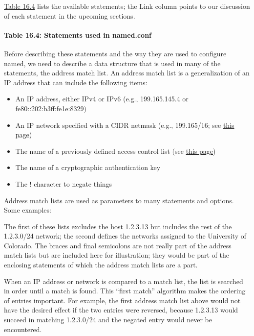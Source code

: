 \protect\hyperlink{part0024_split_035.htmlux5cux23_idTextAnchor896}{Table
16.4} lists the available statements; the Link column points to our
discussion of each statement in the upcoming sections.

\paragraph[{Table 16.4: }Statements used in
{named.conf}]{\texorpdfstring{{Table 16.4:
}\protect\hypertarget{part0024_split_035.htmlux5cux23_idTextAnchor896}{}{}Statements
used in {named.conf}}{Table 16.4: Statements used in named.conf}}


Before describing these statements and the way they are used to
configure {named}, we need to describe a data structure that is used in
many of the statements, the address match list. An address match list is
a generalization of an IP address that can include the following items:

\begin{itemize}
\item
  An IP address, either IPv4 or IPv6 (e.g., 199.165.145.4 or
  fe80::202:b3ff:fe1e:8329)
\item
  An IP network specified with a CIDR netmask (e.g., 199.165/16; see
  \protect\hyperlink{part0021_split_019.htmlux5cux23_idTextAnchor653}{this
  page})
\item
  The name of a previously defined access control list (see
  \protect\hyperlink{part0024_split_038.htmlux5cux23_idTextAnchor904}{this
  page})
\item
  The name of a cryptographic authentication key
\item
  The {!} character to negate things
\end{itemize}

Address match lists are used as parameters to many statements and
options. Some examples:


The first of these lists excludes the host 1.2.3.13 but includes the
rest of the 1.2.3.0/24 network; the second defines the networks assigned
to the University of Colorado. The braces and final semicolons are not
really part of the address match lists but are included here for
illustration; they would be part of the enclosing statements of which
the address match lists are a part.

When an IP address or network is compared to a match list, the list is
searched in order until a match is found. This ``first match'' algorithm
makes the ordering of entries important. For example, the first address
match list above would not have the desired effect if the two entries
were reversed, because 1.2.3.13 would succeed in matching 1.2.3.0/24 and
the negated entry would never be encountered.

